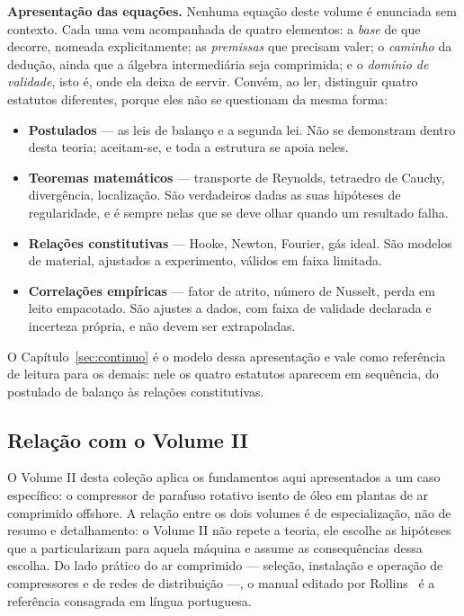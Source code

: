 \documentclass[12pt,a4paper]{article}
\numberwithin{equation}{section}
\numberwithin{table}{section}
\numberwithin{figure}{section}
\begin{document}
\textbf{Apresentação das equações.} Nenhuma equação deste volume é enunciada
sem contexto. Cada uma vem acompanhada de quatro elementos: a \emph{base} de
que decorre, nomeada explicitamente; as \emph{premissas} que precisam valer;
o \emph{caminho} da dedução, ainda que a álgebra intermediária seja
comprimida; e o \emph{domínio de validade}, isto é, onde ela deixa de servir.
Convém, ao ler, distinguir quatro estatutos diferentes, porque eles não se
questionam da mesma forma:

\begin{itemize}
	\item \textbf{Postulados} --- as leis de balanço e a segunda lei. Não se
	demonstram dentro desta teoria; aceitam-se, e toda a estrutura se apoia
	neles.
	\item \textbf{Teoremas matemáticos} --- transporte de Reynolds, tetraedro
	de Cauchy, divergência, localização. São verdadeiros dadas as suas hipóteses
	de regularidade, e é sempre nelas que se deve olhar quando um resultado
	falha.
	\item \textbf{Relações constitutivas} --- Hooke, Newton, Fourier, gás
	ideal. São modelos de material, ajustados a experimento, válidos em faixa
	limitada.
	\item \textbf{Correlações empíricas} --- fator de atrito, número de
	Nusselt, perda em leito empacotado. São ajustes a dados, com faixa de
	validade declarada e incerteza própria, e não devem ser extrapoladas.
\end{itemize}

O Capítulo~\ref{sec:continuo} é o modelo dessa apresentação e vale como
referência de leitura para os demais: nele os quatro estatutos aparecem em
sequência, do postulado de balanço às relações constitutivas.

\subsection{Relação com o Volume II}

O Volume II desta coleção aplica os fundamentos aqui apresentados a um caso
específico: o compressor de parafuso rotativo isento de óleo em plantas de ar
comprimido offshore. A relação entre os dois volumes é de especialização, não
de resumo e detalhamento: o Volume II não repete a teoria, ele escolhe as
hipóteses que a particularizam para aquela máquina e assume as consequências
dessa escolha. Do lado prático do ar comprimido --- seleção, instalação e
operação de compressores e de redes de distribuição ---, o manual editado por
Rollins~\cite{rollins2004} é a referência consagrada em língua portuguesa.
\end{document}
